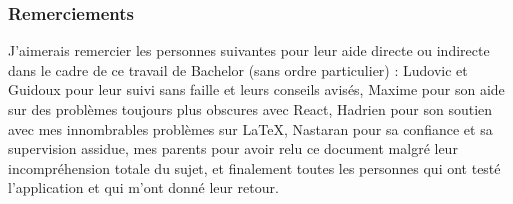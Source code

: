 \subsubsection{Remerciements}

J'aimerais remercier les personnes suivantes pour leur aide directe ou indirecte dans le cadre de ce travail de Bachelor (sans ordre particulier) : Ludovic et Guidoux pour leur suivi sans faille et leurs conseils avisés, Maxime pour son aide sur des problèmes toujours plus obscures avec React, Hadrien pour son soutien avec mes innombrables problèmes sur LaTeX, Nastaran pour sa confiance et sa supervision assidue, mes parents pour avoir relu ce document malgré leur incompréhension totale du sujet, et finalement toutes les personnes qui ont testé l'application et qui m'ont donné leur retour.
